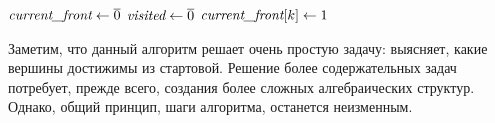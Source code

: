 \begin{algorithm}
    $\emph{current\_front} \leftarrow \overline{0}$\;
    $\emph{visited} \leftarrow \overline{0}$\;
    $\emph{current\_front}[k] \leftarrow 1$\;
    \;
    \caption{Алгоритм обхода в ширину в терминах линейной алгебры}
    \label{algo:BFS_linal}
\end{algorithm}

Заметим, что данный алгоритм решает очень простую задачу: выясняет, какие вершины достижимы из стартовой.
Решение более содержательных задач потребует, прежде всего, создания более сложных алгебраических структур.
Однако, общий принцип, шаги алгоритма, останется неизменным.

%
%
%
%
%
%
%
%
%
%
%
%
%

